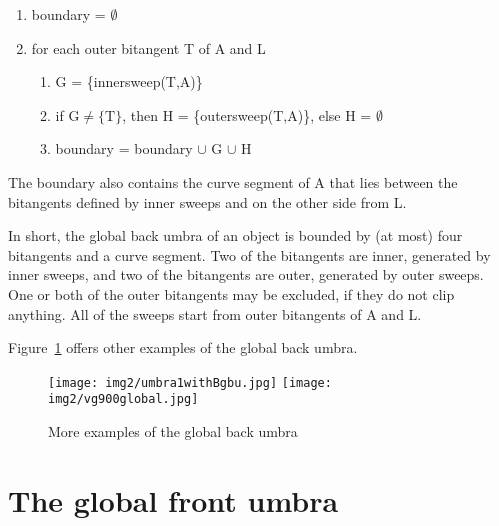 \documentclass[9pt,twocolumn]{article}
\begin{document}
\begin{enumerate}
\item boundary = $\emptyset$
\item for each outer bitangent T of A and L
\begin{enumerate}
\item G = \{innersweep(T,A)\}
\item if $\mbox{G} \neq \{\mbox{T}\}$, then H = \{outersweep(T,A)\}, else H = $\emptyset$
\item boundary = boundary $\cup$ G $\cup$ H
\end{enumerate}
\end{enumerate}

The boundary also contains the curve segment 
of A that lies between the bitangents defined by inner sweeps and on the other side from L.

In short, 
the global back umbra of an object 
is bounded by (at most) four bitangents and a curve segment.
Two of the bitangents are inner, generated by inner sweeps,
and two of the bitangents are outer, generated by outer sweeps.
One or both of the outer bitangents may be excluded, if they do not clip anything.
All of the sweeps start from outer bitangents of A and L.

Figure~\ref{fig:globalback} offers other examples of the global back umbra.

\begin{figure}
\begin{center}
\texttt{[image: img2/umbra1withBgbu.jpg]}
\texttt{[image: img2/vg900global.jpg]}
\end{center}
\caption{More examples of the global back umbra}
\label{fig:globalback}
\end{figure}



\section{The global front umbra}
\label{sec:globalfront} 
\end{document}
